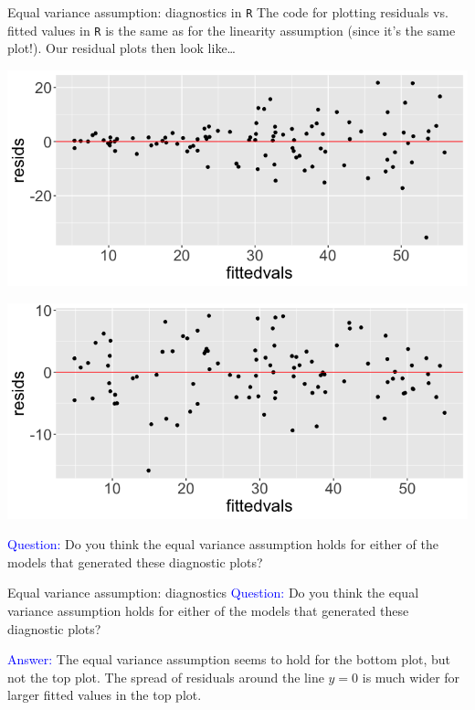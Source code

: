 \documentclass[10pt,t]{beamer}
\begin{document}
\begin{frame}{Equal variance assumption: diagnostics in \texttt{R}}
The code for plotting residuals vs. fitted values in \texttt{R} is the same as for the linearity assumption (since it's the same plot!). Our residual plots then look like\dots

\centering

\includegraphics[scale=0.2]{eqvar_resids1.png}

\includegraphics[scale=0.2]{eqvar_resids2.png}

\textcolor{blue}{Question:} Do you think the equal variance assumption holds for either of the models that generated these diagnostic plots?

\end{frame}

\begin{frame}{Equal variance assumption: diagnostics}
\textcolor{blue}{Question:} Do you think the equal variance assumption holds for either of the models that generated these diagnostic plots?

\vspace{0.3cm}

\textcolor{blue}{Answer:} The equal variance assumption seems to hold for the bottom plot, but not the top plot. The spread of residuals around the line $y = 0$ is much wider for larger fitted values in the top plot. 
\end{frame}
\end{document}
